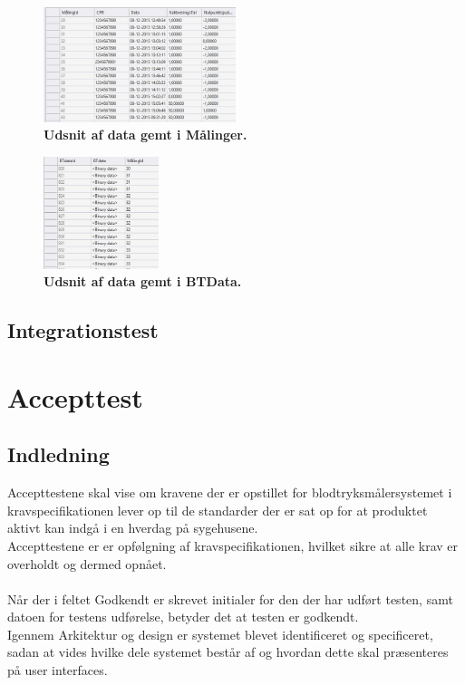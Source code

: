 \begin{figure}[H]
\includegraphics[width =0.5\textwidth , center]{billeder/database_data_gem}
\caption{\textbf{Udsnit af data gemt i Målinger.}}
\end{figure}
\begin{figure}[H]
\includegraphics[width =0.3\textwidth , center]{billeder/database_bt_gem}
\caption{\textbf{Udsnit af data gemt i BTData.}}
\end{figure}
\section{Integrationstest}
\chapter{Accepttest}
\section{Indledning}
Accepttestene skal vise om kravene der er opstillet for blodtryksmålersystemet i kravspecifikationen lever op til de standarder der er sat op for at produktet aktivt kan indgå i en hverdag på sygehusene.\\
Accepttestene er er opfølgning af kravspecifikationen, hvilket sikre at alle krav er overholdt og dermed opnået.\\\\
Når der i feltet Godkendt er skrevet initialer for den der har udført testen, samt datoen for testens udførelse, betyder det at testen er godkendt.  \\
Igennem Arkitektur og design er systemet blevet identificeret og specificeret, sadan at vides hvilke dele systemet består af og hvordan dette skal præsenteres på user interfaces.
